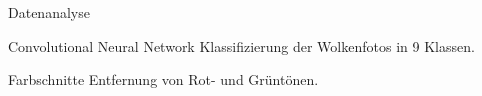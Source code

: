 \begin{frame}[t]{Datenanalyse}
  \begin{block}{Convolutional Neural Network}
    Klassifizierung der Wolkenfotos in 9 Klassen.
  \end{block}
	\begin{block}{Farbschnitte}
    Entfernung von Rot- und Grüntönen.
	\end{block}
\end{frame}
